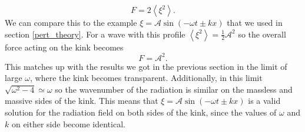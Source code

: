 \documentclass[11pt, oneside]{article}  	%
\numberwithin{equation}{section}
\begin{document}
\begin{equation}
F = 2\left \langle \xi^2 \right \rangle.
\end{equation}
We can compare this to the example $\xi = \mathcal{A}\sin( - \omega t \pm k x)$ that we used in section \ref{pert_theory}. For a wave with this profile $ \left \langle \xi^2 \right \rangle = \frac{1}{2}\mathcal{A}^2$ so the overall force acting on the kink becomes
\begin{equation}
F = \mathcal{A}^2.
\end{equation}
This matches up with the results we got in the previous section in the limit of large $\omega$, where the kink becomes transparent. Additionally, in this limit $\sqrt{\omega^2 - 4} \simeq \omega$ so the wavenumber of the radiation is similar on the massless and massive sides of the kink. This means that $\xi = \mathcal{A}\sin( - \omega t \pm k x)$ is a valid solution for the radiation field on both sides of the kink, since the values of $\omega$ and $k$ on either side become identical.
\end{document}

